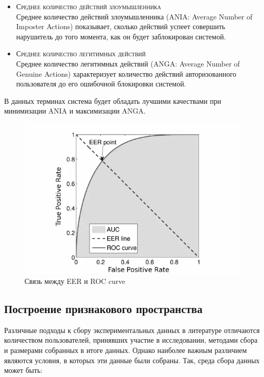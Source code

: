 \documentclass[12pt]{article}
\begin{document}
    \begin{itemize}
        \item \textsc{Среднее количество действий злоумышленника} \\
        Среднее количество действий злоумышленника (ANIA: Average Number of Imposter Actions) показывает, сколько действий успеет совершить нарушитель до того момента, как он будет заблокирован системой.
        \item \textsc{Среднее количество легитимных действий} \\
        Среднее количество легитимных действий (ANGA: Average Number of Genuine Actions) характеризует количество действий авторизованного пользователя до его ошибочной блокировки системой.
    \end{itemize}

    \par В данных терминах система будет обладать лучшими качествами при минимизации ANIA и максимизации ANGA.

    \begin{figure}[h!]
        \centering
        \includegraphics[width=0.9\linewidth]{EER_ROC.png}
        \caption{Связь между EER и ROC curve}
        \label{sec:Overview:Metrics:fig:EER_ROC}
    \end{figure}


    \subsection{Построение признакового пространства}
    \label{sec:Overview:Features}

    \par Различные подходы к сбору экспериментальных данных в литературе отличаются количеством пользователей, принявших участие в исследовании, методами сбора и размерами собранных в итоге данных. Однако наиболее важным различием являются условия, в которых эти данные были собраны. Так, среда сбора данных может быть:
\end{document}
